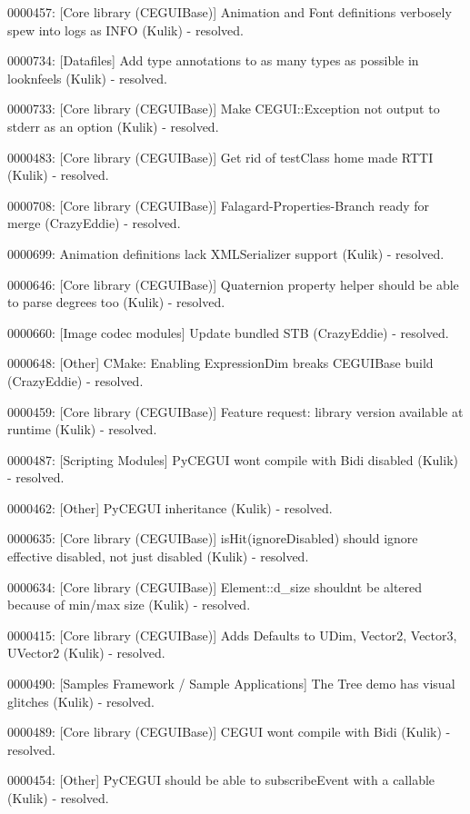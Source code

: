 \begin{DoxyItemize}
\item 0000457\+: \mbox{[}Core library (C\+E\+G\+U\+I\+Base)\mbox{]} Animation and Font definitions verbosely spew into logs as I\+N\+FO (Kulik) -\/ resolved.
\item 0000734\+: \mbox{[}Datafiles\mbox{]} Add type annotations to as many types as possible in looknfeels (Kulik) -\/ resolved.
\item 0000733\+: \mbox{[}Core library (C\+E\+G\+U\+I\+Base)\mbox{]} Make C\+E\+G\+U\+I\+::\+Exception not output to stderr as an option (Kulik) -\/ resolved.
\item 0000483\+: \mbox{[}Core library (C\+E\+G\+U\+I\+Base)\mbox{]} Get rid of test\+Class home made R\+T\+TI (Kulik) -\/ resolved.
\item 0000708\+: \mbox{[}Core library (C\+E\+G\+U\+I\+Base)\mbox{]} Falagard-\/\+Properties-\/\+Branch ready for merge (Crazy\+Eddie) -\/ resolved.
\item 0000699\+: Animation definitions lack X\+M\+L\+Serializer support (Kulik) -\/ resolved.
\item 0000646\+: \mbox{[}Core library (C\+E\+G\+U\+I\+Base)\mbox{]} Quaternion property helper should be able to parse degrees too (Kulik) -\/ resolved.
\item 0000660\+: \mbox{[}Image codec modules\mbox{]} Update bundled S\+TB (Crazy\+Eddie) -\/ resolved.
\item 0000648\+: \mbox{[}Other\mbox{]} C\+Make\+: Enabling Expression\+Dim breaks C\+E\+G\+U\+I\+Base build (Crazy\+Eddie) -\/ resolved.
\item 0000459\+: \mbox{[}Core library (C\+E\+G\+U\+I\+Base)\mbox{]} Feature request\+: library version available at runtime (Kulik) -\/ resolved.
\item 0000487\+: \mbox{[}Scripting Modules\mbox{]} Py\+C\+E\+G\+UI won\textquotesingle{}t compile with Bidi disabled (Kulik) -\/ resolved.
\item 0000462\+: \mbox{[}Other\mbox{]} Py\+C\+E\+G\+UI inheritance (Kulik) -\/ resolved.
\item 0000635\+: \mbox{[}Core library (C\+E\+G\+U\+I\+Base)\mbox{]} is\+Hit(ignore\+Disabled) should ignore effective disabled, not just disabled (Kulik) -\/ resolved.
\item 0000634\+: \mbox{[}Core library (C\+E\+G\+U\+I\+Base)\mbox{]} Element\+::d\+\_\+size shouldn\textquotesingle{}t be altered because of min/max size (Kulik) -\/ resolved.
\item 0000415\+: \mbox{[}Core library (C\+E\+G\+U\+I\+Base)\mbox{]} Adds Defaults to U\+Dim, Vector2, Vector3, U\+Vector2 (Kulik) -\/ resolved.
\item 0000490\+: \mbox{[}Samples Framework / Sample Applications\mbox{]} The Tree demo has visual glitches (Kulik) -\/ resolved.
\item 0000489\+: \mbox{[}Core library (C\+E\+G\+U\+I\+Base)\mbox{]} C\+E\+G\+UI won\textquotesingle{}t compile with Bidi (Kulik) -\/ resolved.
\item 0000454\+: \mbox{[}Other\mbox{]} Py\+C\+E\+G\+UI should be able to subscribe\+Event with a callable (Kulik) -\/ resolved.
\end{DoxyItemize}


